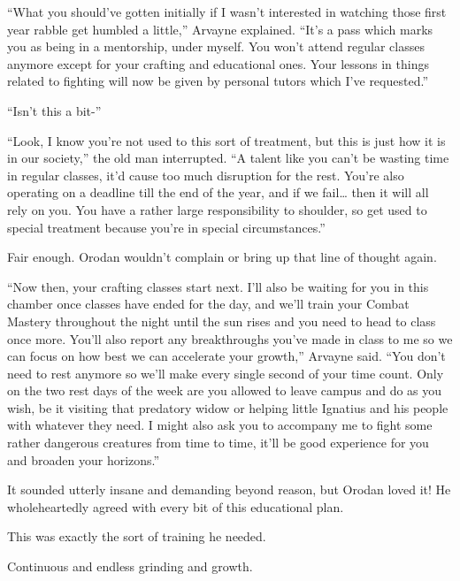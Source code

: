 \documentclass[a4paper,10pt]{book}
\begin{document}
“What you should’ve gotten initially if I wasn’t interested in watching those first year rabble get humbled a little,” Arvayne explained. “It’s a pass which marks you as being in a mentorship, under myself. You won’t attend regular classes anymore except for your crafting and educational ones. Your lessons in things related to fighting will now be given by personal tutors which I’ve requested.”\par
“Isn’t this a bit-”\par
“Look, I know you’re not used to this sort of treatment, but this is just how it is in our society,” the old man interrupted. “A talent like you can’t be wasting time in regular classes, it’d cause too much disruption for the rest. You’re also operating on a deadline till the end of the year, and if we fail… then it will all rely on you. You have a rather large responsibility to shoulder, so get used to special treatment because you’re in special circumstances.”\par
Fair enough. Orodan wouldn’t complain or bring up that line of thought again.\par
“Now then, your crafting classes start next. I’ll also be waiting for you in this chamber once classes have ended for the day, and we’ll train your Combat Mastery throughout the night until the sun rises and you need to head to class once more. You’ll also report any breakthroughs you’ve made in class to me so we can focus on how best we can accelerate your growth,” Arvayne said. “You don’t need to rest anymore so we’ll make every single second of your time count. Only on the two rest days of the week are you allowed to leave campus and do as you wish, be it visiting that predatory widow or helping little Ignatius and his people with whatever they need. I might also ask you to accompany me to fight some rather dangerous creatures from time to time, it’ll be good experience for you and broaden your horizons.”\par
It sounded utterly insane and demanding beyond reason, but Orodan loved it! He wholeheartedly agreed with every bit of this educational plan.\par
This was exactly the sort of training he needed.\par
Continuous and endless grinding and growth.\par
\end{document}
